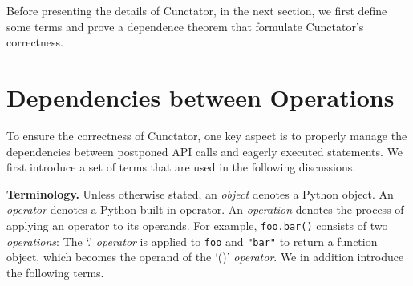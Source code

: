 \documentclass[sigconf]{acmart}\settopmatter{printfolios=true,printccs=false,printacmref=false}\setcopyright{none}
\begin{document}
Before presenting the details of Cunctator, in the next section, we first define some terms and prove a dependence theorem that formulate Cunctator's correctness.

\section{Dependencies between Operations}
\label{sec:deps}

To ensure the correctness of Cunctator, one key aspect is to properly manage the dependencies between postponed API calls and eagerly executed statements. We first introduce a set of terms that are used in the following discussions. 

\vspace{0.1in}
\noindent\textbf{Terminology.} Unless otherwise stated, an \textit{object} denotes a Python object. An \textit{operator} denotes a Python built-in operator. An \textit{operation} denotes the process of applying an operator to its operands. For example, 
\texttt{foo.bar()} consists of two {\em operations}: The `.' {\em operator} is applied to \texttt{foo} and \texttt{"bar"} to return a function object, which becomes the operand of the `()' {\em operator}. We in addition introduce the following terms.
\end{document}
